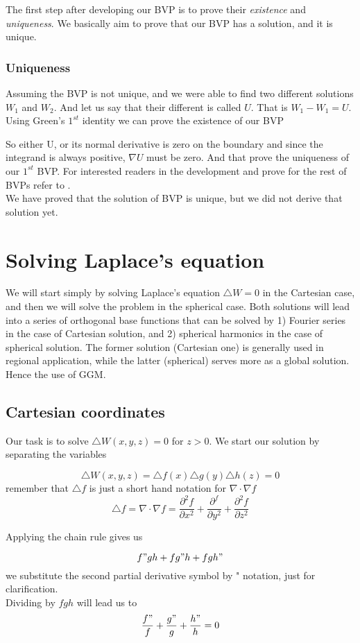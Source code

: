 The first step after developing our BVP is to prove their \textit{existence} and \textit{uniqueness}. We basically aim to prove that our BVP has a solution, and it is unique.

\subsubsection{Uniqueness}
Assuming the BVP is not unique, and we were able to find two different solutions $W_1$ and $W_2$. And let us say that their different is called $U$. That is $W_1 - W_1 = U$. Using Green's $1^{st}$ identity we can prove the existence of our BVP


So either U, or its normal derivative is zero on the boundary and since the integrand is always positive, $\nabla U$ must be zero.
And that prove the uniqueness of our $1^{st}$ BVP. For interested readers in the development and prove for the rest of BVPs refer to \cite{lndrem}.  
\\
We have proved that the solution of BVP is unique, but we did not derive that solution yet.

\section{Solving Laplace's equation}
We will start simply by solving Laplace's equation $\triangle W = 0$ in the Cartesian case, and then we will solve the problem in the spherical case. Both solutions will lead into a series of orthogonal base functions that can be solved by 1) Fourier series in the case of Cartesian solution, and 2) spherical harmonics in the case of spherical solution. The former solution (Cartesian one) is generally used in regional application, while the latter (spherical) serves more as a global solution. Hence the use of GGM.

\subsection{Cartesian coordinates}
Our task is to solve $\triangle W(x, y, z) = 0$ for $z > 0$. We start our solution by separating the variables

\begin{equation}
\triangle W(x, y, z) = \triangle f(x) \triangle g(y) \triangle h(z) = 0
\end{equation}
remember that $\triangle f$ is just a short hand notation for $\nabla \cdot \nabla f$
\begin{displaymath}
\triangle f = \nabla \cdot \nabla f = \frac{\partial^2 f}{\partial x^2} + \frac{\partial^f}{\partial y^2} + \frac{\partial^2 f}{\partial z^2}
\end{displaymath}

Applying the chain rule gives us

\begin{equation}
f"gh + fg"h + fgh"
\end{equation}
we substitute the second partial derivative symbol by " notation, just for clarification. 
\\
Dividing by $fgh$ will lead us to
\begin{equation}
\frac{f"}{f} + \frac{g"}{g} + \frac{h"}{h} = 0
\end{equation}


